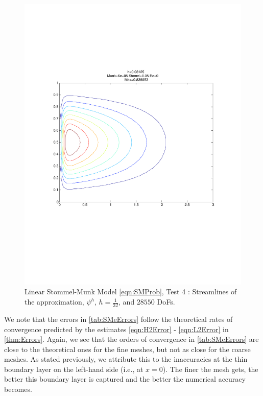 \begin{figure}%
  \begin{center}
    \includegraphics[trim=0 200 20 220, clip=true, scale=0.5]{StommelMunk2.pdf}
    \caption{Linear Stommel-Munk Model \eqref{eqn:SMProb}, Test 4 \cite{Cascon}: Streamlines of the approximation,
    $\psi^h$, $h=\frac{1}{32}$, and $28550$ DoFs.}
    \label{fig:SMe}
  \end{center}
\end{figure}

We note that the errors in \autoref{tab:SMeErrors} follow the theoretical rates
of convergence predicted by the estimates \eqref{eqn:H2Error} -
\eqref{eqn:L2Error} in \autoref{thm:Errors}. Again, we see that the orders of
convergence in \autoref{tab:SMeErrors} are close to the theoretical ones for the
fine meshes, but not as close for the coarse meshes. As stated previously, we
attribute this to the inaccuracies at the thin boundary layer on the left-hand
side (i.e., at $x=0$). The finer the mesh gets, the better this boundary layer
is captured and the better the numerical accuracy becomes.

